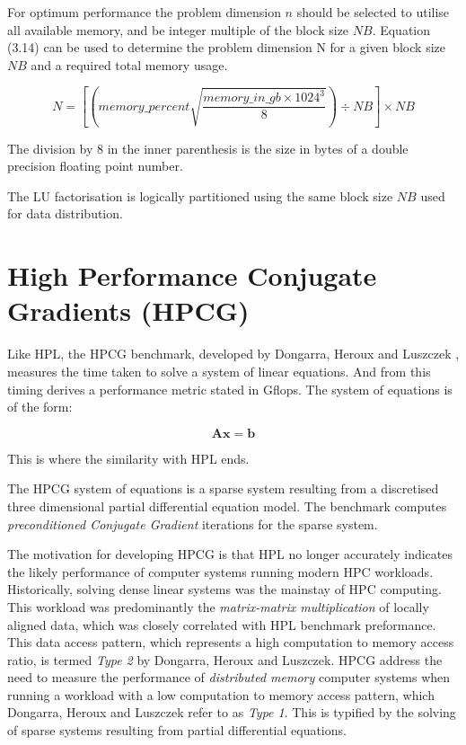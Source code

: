 For optimum performance the problem dimension $n$ should be selected to utilise all available memory, and be integer multiple of the block size $NB$. Equation (3.14) can be used to determine the problem dimension N for a given block size $NB$ and a required total memory usage.

\begin{equation}
N = \left[\left(memory\_percent \sqrt{\frac{memory\_in\_gb \times 1024^3}{8}}\right) \div NB\right] \times NB
\end{equation}

The division by 8 in the inner parenthesis is the size in bytes of a double precision floating point number.

The LU factorisation is logically partitioned using the same block size $NB$ used for data distribution.


%
%
\section{High Performance Conjugate Gradients (HPCG)}

Like HPL, the HPCG benchmark, developed by Dongarra, Heroux and Luszczek \cite{hpcg-benchmark}, measures the time taken to solve a system of linear equations. And from this timing derives a performance metric stated in Gflops. The system of equations is of the form:

\begin{equation}
\mathbf{Ax} = \mathbf{b}
\end{equation}

This is where the similarity with HPL ends.

The HPCG system of equations is a sparse system resulting from a discretised three dimensional partial differential equation model. The benchmark computes \emph{preconditioned Conjugate Gradient} iterations for the sparse system.

The motivation for developing HPCG is that HPL no longer accurately indicates the likely performance of computer systems running modern HPC workloads. Historically, solving dense linear systems was the mainstay of HPC computing. This workload was predominantly the \emph{matrix-matrix multiplication} of locally aligned data, which was closely correlated with HPL benchmark preformance. This data access pattern, which represents a high computation to memory access ratio, is termed \emph{Type 2} by Dongarra, Heroux and Luszczek. HPCG address the need to measure the performance of \emph{distributed memory} computer systems when running a workload with a low computation to memory access pattern, which Dongarra, Heroux and Luszczek refer to as \emph{Type 1}. This is typified by the solving of sparse systems resulting from partial differential equations.

